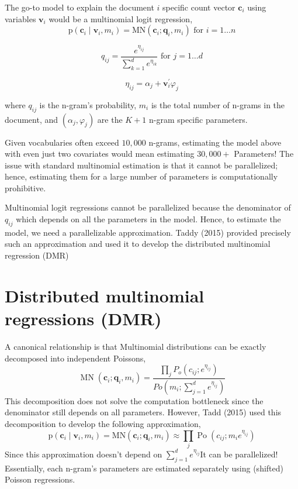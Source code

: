 \documentclass[
]{book}
\begin{document}
The go-to model to explain the document \(i\) specific count vector \(\mathbf{c}_{i}\) using variables \(\mathbf{v}_{i}\) would be a multinomial logit regression,
\[
\mathrm{p}\left(\mathbf{c}_{i} \mid \mathbf{v}_{i}, m_{i}\right) = \mathrm{MN}\left(\mathbf{c}_{i} ; \mathbf{q}_{i}, m_{i}\right) \text{ for } i=1 \ldots n
\]

\[
q_{i j} = \frac{e^{\eta_{i j}}}{\sum_{k=1}^{d} e^{\eta_{i k}}} \text { for } j=1 \ldots d
\]

\[
\eta_{i j} = \alpha_{j}+\mathbf{v}_{i}^{\prime} \varphi_{j}
\]

where \(q_{i j}\) is the n-gram's probability, \(m_i\) is the total number of n-grams in the document, and \((\alpha_j,\varphi_j)\) are the \(K+1\) n-gram specific parameters.

Given vocabularies often exceed \(10,000\) n-grams, estimating the model above with even just two covariates would mean estimating \(30,000+\) Parameters! The issue with standard multinomial estimation is that it cannot be parallelized; hence, estimating them for a large number of parameters is computationally prohibitive.

Multinomial logit regressions cannot be parallelized because the denominator of \(q_{ij}\) which depends on all the parameters in the model. Hence, to estimate the model, we need a parallelizable approximation. Taddy (2015) provided precisely such an approximation and used it to develop the distributed multinomial regression (DMR)

\hypertarget{distributed-multinomial-regressions-dmr}{%
\section{Distributed multinomial regressions (DMR)}\label{distributed-multinomial-regressions-dmr}}

A canonical relationship is that Multinomial distributions can be exactly decomposed into independent Poissons,
\[
\operatorname{MN}\left(\mathbf{c}_{i} ; \mathbf{q}_{i}, m_{i}\right)=\frac{\prod_{j} P_{o}\left(c_{i j} ; e^{\eta_{i j}}\right)}{P o\left(m_{i} ; \sum_{j=1}^{d} e^{\eta_{i j}}\right)}
\]
This decomposition does not solve the computation bottleneck since the denominator still depends on all parameters. However, Tadd (2015) used this decomposition to develop the following approximation,
\[
\mathrm{p}\left(\mathbf{c}_{i} \mid \mathbf{v}_{i}, m_{i}\right)=\mathrm{MN}\left(\mathbf{c}_{i} ; \mathbf{q}_{i}, m_{i}\right) \approx \prod_{j} \operatorname{Po}\left(c_{i j} ; m_{i} e^{\eta_{i j}}\right)
\]
Since this approximation doesn't depend on \(\sum_{j=1}^{d} e^{\eta_{i j}}\)It can be parallelized! Essentially, each n-gram's parameters are estimated separately using (shifted) Poisson regressions.
\end{document}
